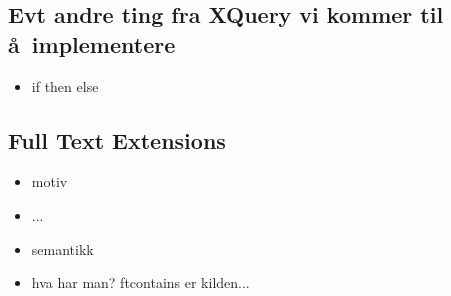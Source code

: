 \subsection{Evt andre ting fra XQuery vi kommer til \aa~implementere}

\begin{itemize}
\item if then else

\end{itemize}

\subsection{Full Text Extensions}

\begin{itemize}
\item motiv
\item ...
\item semantikk
\item hva har man? ftcontains er kilden...
\end{itemize}